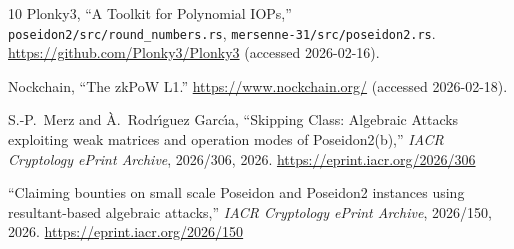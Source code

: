 \documentclass[11pt,a4paper]{article}
\begin{document}
\begin{thebibliography}{10}
Plonky3,
``A Toolkit for Polynomial IOPs,''
\texttt{poseidon2/src/round\_numbers.rs}, \texttt{mersenne-31/src/poseidon2.rs}.
\url{https://github.com/Plonky3/Plonky3} (accessed 2026-02-16).

Nockchain,
``The zkPoW L1.''
\url{https://www.nockchain.org/} (accessed 2026-02-18).

S.-P.~Merz and {\`A}.~Rodr{\'\i}guez Garc{\'\i}a,
``Skipping Class: Algebraic Attacks exploiting weak matrices and operation modes of Poseidon2(b),''
\emph{IACR Cryptology ePrint Archive}, 2026/306, 2026.
\url{https://eprint.iacr.org/2026/306}

``Claiming bounties on small scale Poseidon and Poseidon2 instances using resultant-based algebraic attacks,''
\emph{IACR Cryptology ePrint Archive}, 2026/150, 2026.
\url{https://eprint.iacr.org/2026/150}

\end{thebibliography}
\end{document}
